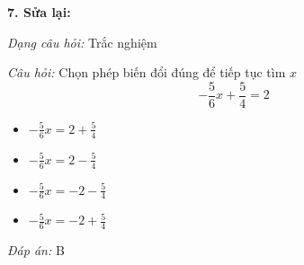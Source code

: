 \noindent\textbf{7. Sửa lại:}

\textit{Dạng câu hỏi:} Trắc nghiệm

\textit{Câu hỏi:} Chọn phép biến đổi đúng để tiếp tục tìm $x$
\[
-\frac{5}{6}x+\frac{5}{4}
    = 2 
\]

\begin{itemize}
    \item[A.] $-\frac{5}{6}x=2+\frac{5}{4}$
    \item[B.] $-\frac{5}{6}x=2-\frac{5}{4}$
    \item[C.] $-\frac{5}{6}x=-2-\frac{5}{4}$
    \item[D.] $-\frac{5}{6}x=-2+\frac{5}{4}$
\end{itemize}

\textit{Đáp án:} B